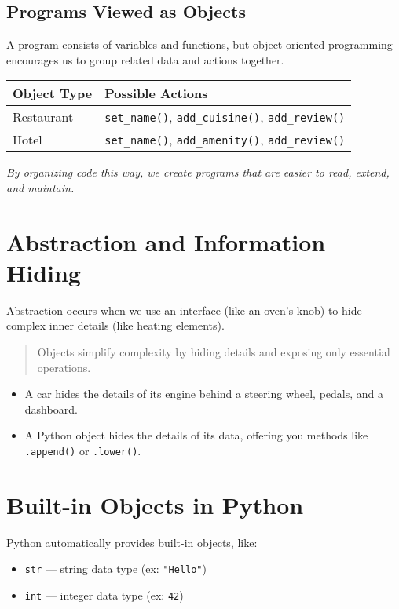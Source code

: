 \subsection{Programs Viewed as Objects}

A program consists of variables and functions, but object-oriented programming encourages us to group related data and actions together.

\begin{center}
\begin{tabular}{|l|l|}
\hline
\textbf{Object Type} & \textbf{Possible Actions} \\
\hline
Restaurant & \texttt{set\_name()}, \texttt{add\_cuisine()}, \texttt{add\_review()} \\
Hotel & \texttt{set\_name()}, \texttt{add\_amenity()}, \texttt{add\_review()} \\
\hline
\end{tabular}
\end{center}

\noindent
\textit{By organizing code this way, we create programs that are easier to read, extend, and maintain.}

\section{Abstraction and Information Hiding}

Abstraction occurs when we use an interface (like an oven’s knob) to hide complex inner details (like heating elements).

\begin{quote}
Objects simplify complexity by hiding details and exposing only essential operations.
\end{quote}


\begin{itemize}
  \item A car hides the details of its engine behind a steering wheel, pedals, and a dashboard.
  \item A Python object hides the details of its data, offering you methods like \texttt{.append()} or \texttt{.lower()}.
\end{itemize}

\section{Built-in Objects in Python}

Python automatically provides built-in objects, like:
\begin{itemize}
  \item \texttt{str} — string data type (ex: \texttt{"Hello"})
  \item \texttt{int} — integer data type (ex: \texttt{42})
\end{itemize}

